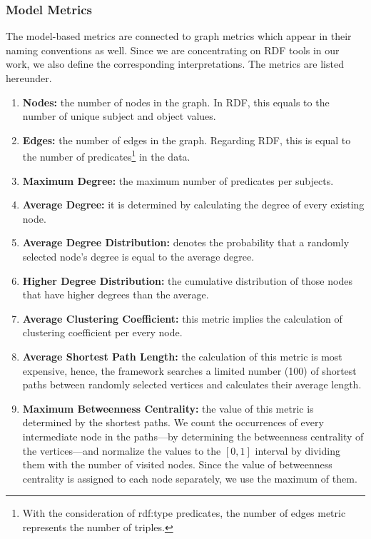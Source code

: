 \subsubsection{Model Metrics}
The model-based metrics are connected to graph metrics which appear in their naming conventions as well. Since we are concentrating on RDF tools in our work, we also define the corresponding interpretations. The metrics are listed hereunder.
\begin{enumerate}
	\item{\textbf{Nodes:}} the number of nodes in the graph. In RDF, this equals to the number of unique subject and object values.
	\item{\textbf{Edges:}} the number of edges in the graph. Regarding RDF, this is equal to the number of predicates\footnote{With the consideration of \textsf{rdf:type} predicates, the number of edges metric represents the number of triples.} in the data.
	\item{\textbf{Maximum Degree:}} the maximum number of predicates per subjects.
	\item{\textbf{Average Degree:}} it is determined by calculating the degree of every existing node.
	\item{\textbf{Average Degree Distribution:}} denotes the probability that a randomly selected node’s degree is equal to the average degree.
	\item{\textbf{Higher Degree Distribution:}} the cumulative distribution of those nodes that have higher degrees than the average.
	\item{\textbf{Average Clustering Coefficient:}} this metric implies the calculation of clustering coefficient per every node.
	\item{\textbf{Average Shortest Path Length:}} the calculation of this metric is most expensive, hence, the framework searches a limited number (100) of shortest paths between randomly selected vertices and calculates their average length.
	\item{\textbf{Maximum Betweenness Centrality:}} the value of this metric is determined by the shortest paths. We count the occurrences of every intermediate node in the paths---by determining the betweenness centrality of the vertices---and normalize the values to the $[0,1]$ interval by dividing them with the number of visited nodes. Since the value of betweenness centrality is assigned to each node separately, we use the maximum of them.
\end{enumerate}


